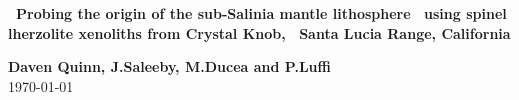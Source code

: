 \documentclass[letterpaper,12pt]{article}
\begin{document}
\begin{spacing}{0.8}\noindent\Gotham\Large\textbf{\
  Probing the origin of the sub-Salinia mantle lithosphere \
  using spinel lherzolite xenoliths from Crystal Knob, \
  Santa Lucia Range, California}\end{spacing}
{\noindent\GothamLight\normalsize\textbf{Daven Quinn, J.Saleeby, M.Ducea and P.Luffi}}\\
{\noindent\GothamLight\normalsize\today}\\


\begin{spacing}{1.2}

\end{spacing}




\pagebreak

\setcounter{secnumdepth}{-1}


\end{document}
